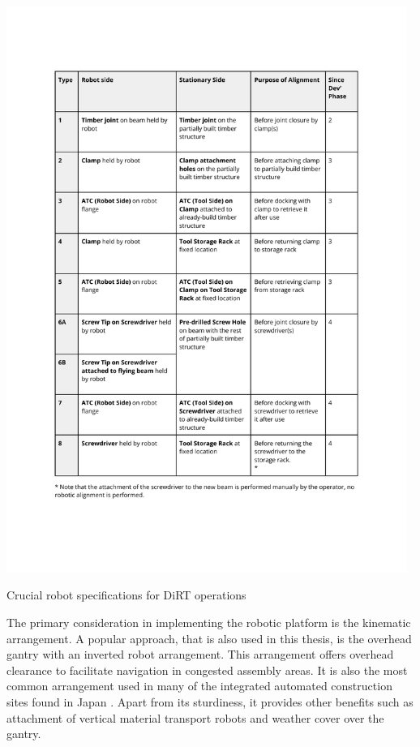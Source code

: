 \begin{table}[hb!]
    \includegraphics[page=10, trim=25.4mm 60mm 23mm 33mm, clip, width=0.98\textwidth]{tables/Tables in Chapter 9 to 11.pdf}
    \caption{Crucial robot specifications for DiRT operations}
    \label{table:dirt-specifications}
\end{table}

The primary consideration in implementing the robotic platform is the kinematic arrangement. A popular approach, that is also used in this thesis, is the overhead gantry with an inverted robot arrangement. This arrangement offers overhead clearance to facilitate navigation in congested assembly areas. It is also the most common arrangement used in many of the integrated automated construction sites found in Japan \parencite{linnerAutomatedRoboticConstruction2013, potterJapanSkyscraperFactories2022}. Apart from its sturdiness, it provides other benefits such as attachment of vertical material transport robots and weather cover over the gantry.

